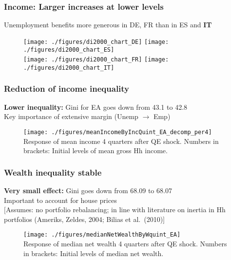 \documentclass[pdflatex,aspectratio=169]{beamer}
\newcommand{\jemph}[1]{{\color{StataDarkBlue}#1}}
\newcommand{\jbemph}[1]{\textbf{\color{SlideNavy}#1}}
\begin{document}
\begin{frame}\frametitle{\bf Income: Larger increases at lower levels}
Unemployment benefits more generous in DE, FR than in ES and \textbf{IT}
\begin{figure}
\begin{center}
\texttt{[image: ./figures/di2000\_chart\_DE]}
\texttt{[image: ./figures/di2000\_chart\_ES]}\\
\texttt{[image: ./figures/di2000\_chart\_FR]}
\texttt{[image: ./figures/di2000\_chart\_IT]}
\end{center}
\end{figure}

\end{frame}


\begin{frame}\frametitle{\bf Reduction of income inequality}
\jbemph{Lower inequality:} Gini for EA goes down from 43.1 to 42.8\\
\jemph{Key importance of extensive margin (Unemp ${}\rightarrow{}$ Emp)}
\begin{figure}
\begin{center}
\texttt{[image: ./figures/meanIncomeByIncQuint\_EA\_decomp\_per4]}\\[-2mm]
{\tiny Response of mean income 4 quarters after QE shock. Numbers in brackets: Initial levels of mean gross Hh income. }
\end{center}
\end{figure}

\end{frame}

\begin{frame}\frametitle{\bf Wealth inequality stable \hypertarget{WealthIneq}{}}
\jbemph{Very small effect:} Gini goes down from 68.09 to 68.07\\
\hspace*{32mm}Important to account for house prices \hyperlink{WealthDecomp}{}\\
{\scriptsize $[$Assumes: \jemph{no portfolio rebalancing;} in line with literature on inertia in Hh portfolios (Ameriks, Zeldes, 2004; Bilias et al.\ (2010)$]$}
\begin{figure}
\begin{center}
\texttt{[image: ./figures/medianNetWealthByWquint\_EA]}\\[-2mm]
{\tiny Response of median net wealth 4 quarters after QE shock. Numbers in brackets: Initial levels of median net wealth.
}
\end{center}
\end{figure}
\end{frame}
\end{document}
